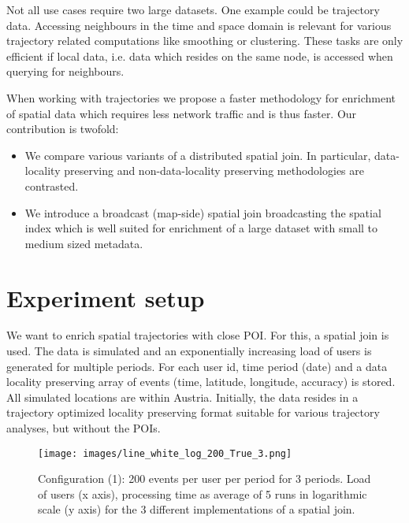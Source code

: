 \documentclass[conference]{IEEEtran}
\begin{document}
Not all use cases require two large datasets. One example could be trajectory data.
Accessing neighbours in the time and space domain is relevant for various trajectory related 
computations like smoothing or clustering.
These tasks are only efficient if local data, i.e. data which resides on the same node, is accessed when querying for neighbours.

When working with trajectories we propose a faster methodology for enrichment of spatial data which requires less network traffic and is thus faster. Our contribution is twofold:
\begin{itemize}
  \item We compare various variants of a distributed spatial join. In particular, data-locality preserving and non-data-locality preserving methodologies are contrasted.
  \item We introduce a broadcast (map-side) spatial join broadcasting the spatial index which is well suited for enrichment of a large dataset with small to medium sized metadata.
\end{itemize}

\section{Experiment setup}
We want to enrich spatial trajectories with close POI. For this, a spatial join is used.
The data is simulated and an exponentially increasing load of users is generated for multiple periods.
For each user id, time period (date) and a data locality preserving array of events (time, 
latitude, longitude, accuracy) is stored.
All simulated locations are within Austria.
Initially, the data resides in a trajectory optimized locality preserving format suitable for various trajectory analyses, but without the POIs.

\begin{figure*}
\centering\texttt{[image: images/line\_white\_log\_200\_True\_3.png]}
\centering\caption{Configuration (1): 200 events per user per period for 3 periods. Load of users (x axis), processing time as average of 5 runs in logarithmic scale (y axis)
for the 3 different implementations of a spatial join.
}
\label{fig:results}
\end{figure*}
\end{document}
